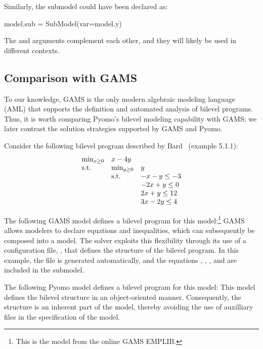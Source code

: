 Similarly, the submodel could have been declared as:
\begin{qlisting}
model.sub = SubModel(var=model.y)
\end{qlisting}
The  and  arguments complement each other,
and they will likely be used in different contexts.
\fi


\subsection{Comparison with GAMS}
\label{gams}

To our knowledge, GAMS is the only modern algebraic modeling language
(AML) that supports the definition and automated analysis of bilevel
programs.  Thus, it is worth comparing Pyomo's bilevel modeling
capability with GAMS; we later contrast the solution strategies
supported by GAMS and Pyomo.

Consider the following bilevel program described by Bard~\cite{Bard98} (example 5.1.1):
\begin{equation*}
\begin{array}{lll}
\min_{x \geq 0} & x - 4 y & \\
\textrm{s.t.} & \min_{y \geq 0} & y\\
 & \textrm{s.t.} & -x -y \leq -3\\
& & -2 x + y \leq 0\\
& & 2 x + y \leq 12\\
& & 3 x - 2 y \leq 4
\end{array}
\end{equation*}

The following GAMS model defines a bilevel program for this
model:\footnote{ This is the  model from the
online GAMS EMPLIB.}
GAMS allows modelers to declare equations and inequalities, which
can subsequently be composed into a model.  The  solver
exploits this flexibility through its use of a configuration file,
, that defines the structure of the bilevel program.
In this example, the  file is generated automatically, and the equations
, , ,  and  are included in the
submodel.
\fi

The following Pyomo model defines a bilevel program for this model:
This model defines the bilevel structure in an object-oriented
manner.  Consequently, the structure is an inherent part of the
model, thereby avoiding the use of auxilliary files in the specification of
the model.

